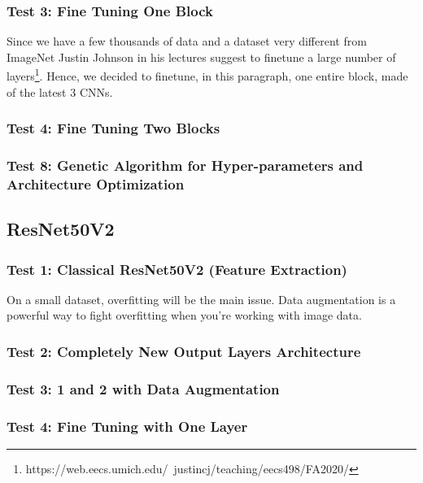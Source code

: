 \medskip





\subsubsection{Test 3: Fine Tuning  One Block}
Since we have a few thousands of data and a dataset very different from ImageNet Justin Johnson in his lectures suggest to finetune a large number of layers\footnote{https://web.eecs.umich.edu/~justincj/teaching/eecs498/FA2020/}. Hence, we decided to finetune, in this paragraph, one entire block, made of the latest 3 CNNs.

\subsubsection{Test 4: Fine Tuning  Two Blocks}

\subsubsection{Test 8: Genetic Algorithm for Hyper-parameters and Architecture Optimization}





\subsection{ResNet50V2}

\subsubsection{Test 1: Classical ResNet50V2 (Feature Extraction)}
On a small dataset, overfitting will be the main issue. Data augmentation is a powerful way to fight overfitting when you’re working with image data.

\subsubsection{Test 2: Completely New Output Layers Architecture}

\subsubsection{Test 3: 1 and 2 with Data Augmentation}

\subsubsection{Test 4: Fine Tuning with One Layer}

